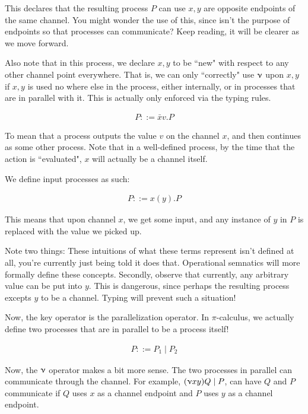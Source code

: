 This declares that the resulting process $P$ can use $x,y$ are opposite endpoints of the same channel. You might wonder the use of this, since isn't the purpose of endpoints so that processes can communicate? Keep reading, it will be clearer as we move forward.

Also note that in this process, we declare $x,y$ to be ``new" with respect to any other channel point everywhere. That is, we can only ``correctly" use $\upnu$ upon $x,y$ if $x,y$ is used no where else in the process, either internally, or in processes that are in parallel with it. This is actually only enforced via the typing rules.


\begin{align*}
    P ::= \bar{x}v.P
\end{align*}

To mean that a process outputs the value $v$ on the channel $x$, and then continues as some other process. Note that in a well-defined process, by the time that the action is ``evaluated", $x$ will actually be a channel itself.

We define input processes as such:

\begin{align*}
    P ::= x(y).P
\end{align*}

This means that upon channel $x$, we get some input, and any instance of $y$ in $P$ is replaced with the value we picked up.

Note two things: These intuitions of what these terms represent isn't defined at all, you're currently just being told it does that. Operational semnatics will more formally define these concepts. Secondly, observe that currently, any arbitrary value can be put into $y$. This is dangerous, since perhaps the resulting process excepts $y$ to be a channel. Typing will prevent such a situation!

Now, the key operator is the parallelization operator. In $\pi$-calculus, we actually define two processes that are in parallel to be a process itself!

\begin{align*}
    P ::= P_1 \mid P_2
\end{align*}

Now, the $\upnu$ operator makes a bit more sense. The two processes in parallel can communicate through the channel. For example, $(\upnu xy) Q \mid P$, can have $Q$ and $P$ communicate if $Q$ uses $x$ as a channel endpoint and $P$ uses $y$ as a channel endpoint.

